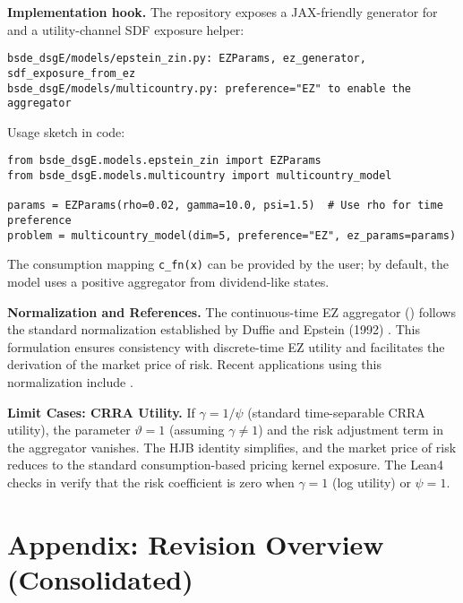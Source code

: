 ﻿\documentclass[11pt,letterpaper,oneside]{article}
\numberwithin{equation}{section}
\newcommand{\1}{\mathbf{1}}
\begin{document}
\begin{tcolorbox}[didacticstyle]
\begin{itemize}[leftmargin=1.1em,itemsep=0.25em]
\begin{tcolorbox}[didacticstyle]
\textbf{Implementation hook.} The repository exposes a JAX-friendly generator
for  and a utility-channel SDF exposure helper:
\begin{verbatim}
bsde_dsgE/models/epstein_zin.py: EZParams, ez_generator, sdf_exposure_from_ez
bsde_dsgE/models/multicountry.py: preference="EZ" to enable the aggregator
\end{verbatim}
Usage sketch in code:
\begin{verbatim}
from bsde_dsgE.models.epstein_zin import EZParams
from bsde_dsgE.models.multicountry import multicountry_model

params = EZParams(rho=0.02, gamma=10.0, psi=1.5)  # Use rho for time preference
problem = multicountry_model(dim=5, preference="EZ", ez_params=params)
\end{verbatim}
The consumption mapping \verb|c_fn(x)| can be provided by the user; by default,
the model uses a positive aggregator from dividend-like states.
\end{tcolorbox}

\begin{tcolorbox}[literaturestyle]
\textbf{Normalization and References.}
The continuous-time EZ aggregator () follows the standard normalization established by Duffie and Epstein (1992) \cite{duffie_epstein_1992}. This formulation ensures consistency with discrete-time EZ utility and facilitates the derivation of the market price of risk. Recent applications using this normalization include \cite{Sauzet2023}.
\end{tcolorbox}

\begin{tcolorbox}[mathstyle]
\textbf{Limit Cases: CRRA Utility.}
If $\gamma = 1/\psi$ (standard time-separable CRRA utility), the parameter $\vartheta=1$ (assuming $\gamma\neq 1$) and the risk adjustment term in the aggregator vanishes. The HJB identity simplifies, and the market price of risk reduces to the standard consumption-based pricing kernel exposure. The Lean4 checks in  verify that the risk coefficient is zero when $\gamma=1$ (log utility) or $\psi=1$.
\end{tcolorbox}

\section*{Appendix: Revision Overview (Consolidated)}


\end{itemize}
\end{tcolorbox}
\end{document}
